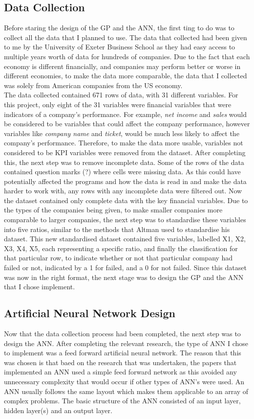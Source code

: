 \documentclass[11pt]{article}
\begin{document}
\subsection{Data Collection}
Before staring the design of the GP and the ANN, the first ting to do was to collect all the data that I planned to use. The data that collected had been given to me by the University of Exeter Business School as they had easy access to multiple years worth of data for hundreds of companies. Due to the fact that each economy is different financially, and companies may perform better or worse in different economies, to make the data more comparable, the data that I collected was solely from American companies from the US economy.\\
The data collected contained 671 rows of data, with 31 different variables. For this project, only eight of the 31 variables were financial variables that were indicators of a company's performance. For example, \textit{net income} and \textit{sales} would be considered to be variables that could affect the company performance, however variables like \textit{company name} and \textit{ticket}, would be much less likely to affect the company's performance. Therefore, to make the data more usable, variables not considered to be KPI variables were removed from the dataset. After completing this, the next step was to remove incomplete data. Some of the rows of the data contained question marks (?) where cells were missing data. As this could have potentially affected the programs and how the data is read in and make the data harder to work with, any rows with any incomplete data were filtered out. Now the dataset contained only complete data with the key financial variables. Due to the types of the companies being given, to make smaller companies more comparable to larger companies, the next step was to standardise these variables into five ratios, similar to the methods that Altman used to standardise his dataset. This new standardised dataset contained five variables, labelled X1, X2, X3, X4, X5, each representing a specific ratio, and finally the classification for that particular row, to indicate whether or not that particular company had failed or not, indicated by a 1 for failed, and a 0 for not failed. Since this dataset was now in the right format, the next stage was to design the GP and the ANN that I chose implement. 

\subsection{Artificial Neural Network Design}
Now that the data collection process had been completed, the next step was to design the ANN. After completing the relevant research, the type of ANN I chose to implement was a feed forward artificial neural network. The reason that this was chosen is that baed on the research that was undertaken, the papers that implemented an ANN used a simple feed forward network as this avoided any unnecessary complexity that would occur if other types of ANN's were used. An ANN usually follows the same layout which makes them applicable to an array of complex problems. The basic structure of the ANN consisted of an input layer, hidden layer(s) and an output layer.
\end{document}
